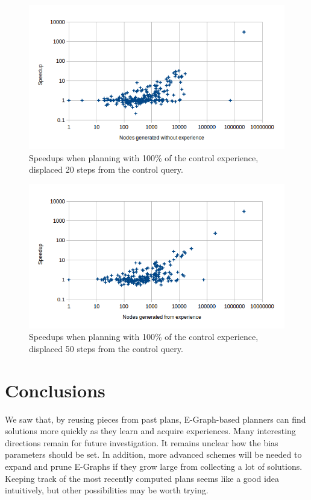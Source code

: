 \documentclass[letterpaper]{article}
\begin{document}
\begin{figure}
	\centering
	\includegraphics[scale=0.5]{Speedup_100_20.png}
	\caption{Speedups when planning with 100\% of the control experience, displaced 20 steps from the control query.}
	 \label{fig:s_100_20}
\end{figure}

\begin{figure}
	\centering
	\includegraphics[scale=0.5]{Speedup_100_50.png}
	\caption{Speedups when planning with 100\% of the control experience, displaced 50 steps from the control query.}
	 \label{fig:s_100_50}
\end{figure}

\section{Conclusions}

We saw that, by reusing pieces from past plans, E-Graph-based planners can find solutions more quickly as they learn and acquire experiences. Many interesting directions remain for future investigation. It remains unclear how the bias parameters should be set. In addition, more advanced schemes will be needed to expand and prune E-Graphs if they grow large from collecting a lot of solutions. Keeping track of the most recently computed plans seems like a good idea intuitively, but other possibilities may be worth trying.
\end{document}
